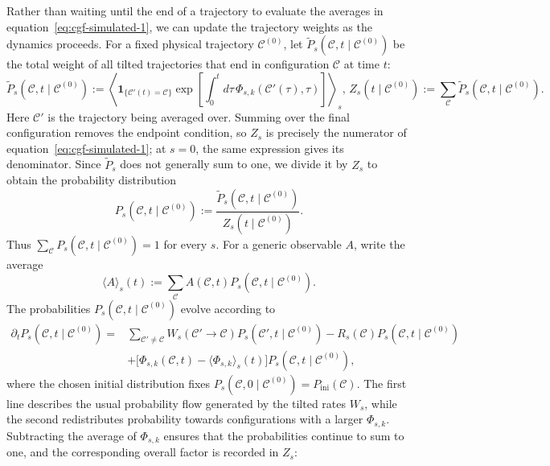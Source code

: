 \documentclass[11pt]{article}
\begin{document}
Rather than waiting until the end of a trajectory to evaluate the averages in equation~\ref{eq:cgf-simulated-1}, we can update the trajectory weights as the dynamics proceeds. For a fixed physical trajectory $\mathcal{C}^{(0)}$, let $\widetilde{P}_s(\mathcal{C},t\mid\mathcal{C}^{(0)})$ be the total weight of all tilted trajectories that end in configuration $\mathcal{C}$ at time $t$:
\begin{equation}
    \widetilde{P}_s(\mathcal{C},t\mid\mathcal{C}^{(0)})
    :={}\left\langle
    \mathbf{1}_{\{\mathcal{C}'(t)=\mathcal{C}\}}
    \exp\!\left[\int_0^t d\tau\,
      \Phi_{s,k}(\mathcal{C}'(\tau),\tau)\right]
    \right\rangle_s,\,
    Z_s(t\mid\mathcal{C}^{(0)}):={}\sum_{\mathcal{C}}
      \widetilde{P}_s(\mathcal{C},t\mid\mathcal{C}^{(0)}).
\end{equation}
Here $\mathcal{C}'$ is the trajectory being averaged over. Summing over the final configuration removes the endpoint condition, so $Z_s$ is precisely the numerator of equation~\ref{eq:cgf-simulated-1}; at $s=0$, the same expression gives its denominator. Since $\widetilde{P}_s$ does not generally sum to one, we divide it by $Z_s$ to obtain the probability distribution
\[
    P_s(\mathcal{C},t\mid\mathcal{C}^{(0)})
    :=\frac{\widetilde{P}_s(\mathcal{C},t\mid\mathcal{C}^{(0)})}
    {Z_s(t\mid\mathcal{C}^{(0)})}.
\]
Thus $\sum_{\mathcal{C}}P_s(\mathcal{C},t\mid\mathcal{C}^{(0)})=1$ for every $s$. For a generic observable $A$, write the average
\[
    \langle A \rangle_s(t)
    :=\sum_{\mathcal{C}}A(\mathcal{C},t)
      P_s(\mathcal{C},t\mid\mathcal{C}^{(0)}).
\]
The probabilities $P_s(\mathcal{C},t\mid\mathcal{C}^{(0)})$ evolve according to
\begin{equation}
\begin{split}
    \partial_t P_s(\mathcal{C},t\mid\mathcal{C}^{(0)})
    ={}& \sum_{\mathcal{C}'\neq\mathcal{C}}
    W_s(\mathcal{C}'\to\mathcal{C})
    P_s(\mathcal{C}',t\mid\mathcal{C}^{(0)})
    -R_s(\mathcal{C})
    P_s(\mathcal{C},t\mid\mathcal{C}^{(0)}) \\
    &+\bigl[\Phi_{s,k}(\mathcal{C},t)
    -\langle \Phi_{s,k}\rangle_s(t)\bigr]
    P_s(\mathcal{C},t\mid\mathcal{C}^{(0)}),
\end{split}
    \label{eq:tilted-probability-evolution}
\end{equation}
where the chosen initial distribution fixes $P_s(\mathcal{C},0\mid\mathcal{C}^{(0)})=P_{\mathrm{ini}}(\mathcal{C})$. The first line describes the usual probability flow generated by the tilted rates $W_s$, while the second redistributes probability towards configurations with a larger $\Phi_{s,k}$. Subtracting the average of $\Phi_{s,k}$ ensures that the probabilities continue to sum to one, and the corresponding overall factor is recorded in $Z_s$:
\end{document}
